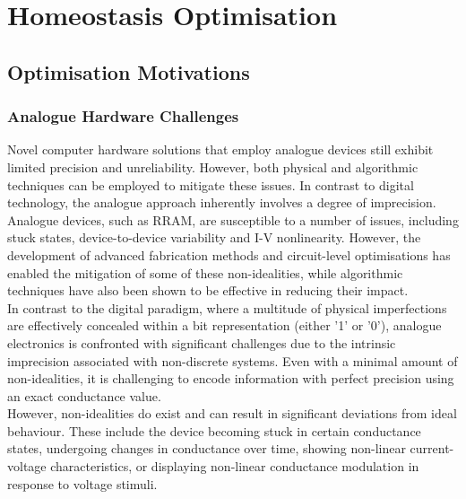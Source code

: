 
\chapter{Homeostasis Optimisation}

\section[Optimisation Motivations]{Optimisation Motivations}

\subsection[Analogue Hardware Challenges]{Analogue Hardware Challenges}

\noindent Novel computer hardware solutions that employ analogue devices still exhibit limited precision and unreliability. However, both physical and algorithmic techniques can be employed to mitigate these issues. In contrast to digital technology, the analogue approach inherently involves a degree of imprecision. \\

\noindent Analogue devices, such as RRAM, are susceptible to a number of issues, including stuck states, device-to-device variability and I-V nonlinearity. However, the development of advanced fabrication methods and circuit-level optimisations has enabled the mitigation of some of these non-idealities, while algorithmic techniques have also been shown to be effective in reducing their impact.\\

\noindent In contrast to the digital paradigm, where a multitude of physical imperfections are effectively concealed within a bit representation (either '1' or '0'), analogue electronics is confronted with significant challenges due to the intrinsic imprecision associated with non-discrete systems. Even with a minimal amount of non-idealities, it is challenging to encode information with perfect precision using an exact conductance value.\\

\noindent However, non-idealities do exist and can result in significant deviations from ideal behaviour. These include the device becoming stuck in certain conductance states, undergoing changes in conductance over time, showing non-linear current-voltage characteristics, or displaying non-linear conductance modulation in response to voltage stimuli. \\

